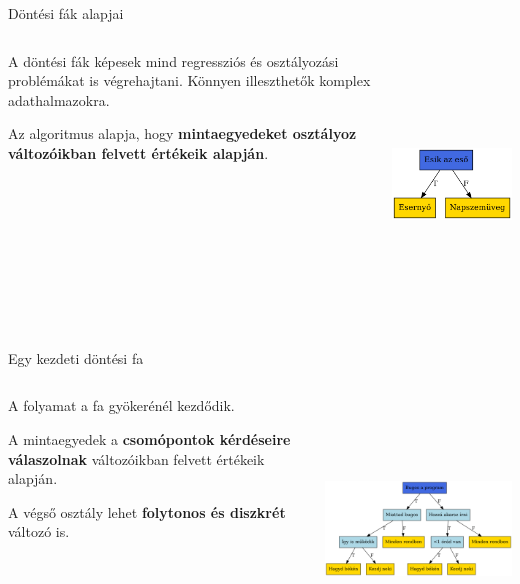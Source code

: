 \documentclass[english, aspectratio=169]{beamer}
\begin{document}
\begin{frame}{Döntési fák alapjai}
\begin{columns}
\begin{column}{.5\textwidth}
A döntési fák képesek mind regressziós és osztályozási problémákat is végrehajtani. Könnyen illeszthetők komplex adathalmazokra.\par\medskip
Az algoritmus alapja, hogy \textbf{mintaegyedeket osztályoz változóikban felvett értékeik alapján}. 
\end{column}
\begin{column}{.5\textwidth}
\begin{center}
\includegraphics[width=7cm, height=7cm, keepaspectratio]{graphs/decision_trees_1.png}
\end{center}
\end{column}
\end{columns}
\end{frame}

\begin{frame}{Egy kezdeti döntési fa}
\begin{columns}
\begin{column}{.3\textwidth}
A folyamat a fa gyökerénél kezdődik.\par\medskip
A mintaegyedek a \textbf{csomópontok kérdéseire válaszolnak} változóikban felvett értékeik alapján.\par\medskip
A végső osztály lehet \textbf{folytonos és diszkrét} változó is.
\end{column}
\begin{column}{.7\textwidth}
\begin{center}
\includegraphics[width=10cm, height=7cm, keepaspectratio]{graphs/decision_trees_2.png}
\end{center}
\end{column}
\end{columns}
\end{frame}
\end{document}
